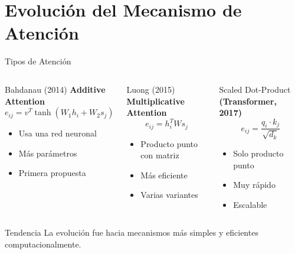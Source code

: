 \documentclass[aspectratio=169]{beamer}
\begin{document}
\section{Evolución del Mecanismo de Atención}

\begin{frame}{Tipos de Atención}
    \begin{columns}[t]
        \begin{block}{Bahdanau (2014)}
            \textbf{Additive Attention}
            \[
            e_{ij} = v^T \tanh(W_1 h_i + W_2 s_j)
            \]
            \begin{itemize}
                \item Usa una red neuronal
                \item Más parámetros
                \item Primera propuesta
            \end{itemize}
        \end{block}
        
        \begin{block}{Luong (2015)}
            \textbf{Multiplicative Attention}
            \[
            e_{ij} = h_i^T W s_j
            \]
            \begin{itemize}
                \item Producto punto con matriz
                \item Más eficiente
                \item Varias variantes
            \end{itemize}
        \end{block}
        
        \begin{block}{Scaled Dot-Product}
            \textbf{(Transformer, 2017)}
            \[
            e_{ij} = \frac{q_i \cdot k_j}{\sqrt{d_k}}
            \]
            \begin{itemize}
                \item Solo producto punto
                \item Muy rápido
                \item Escalable
            \end{itemize}
        \end{block}
    \end{columns}
    
    \vspace{0.4cm}
    \begin{exampleblock}{Tendencia}
        La evolución fue hacia mecanismos más simples y eficientes computacionalmente.
    \end{exampleblock}
\end{frame}
\end{document}
